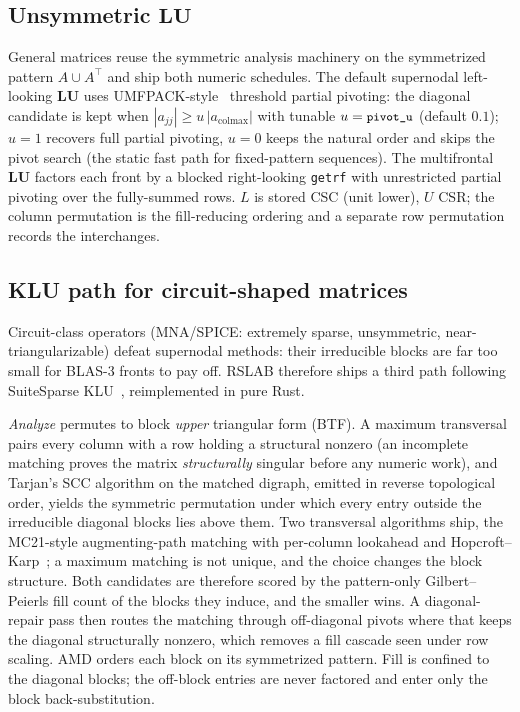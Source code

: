 \documentclass[11pt,a4paper]{article}
\newcommand{\rT}{\textsf{RSLAB}}
\newcommand{\code}[1]{\texttt{\small #1}}
\newcommand{\LU}{\mathbf{L}\mathbf{U}}
\begin{document}
\subsection{Unsymmetric \texorpdfstring{$\LU$}{LU}}
General matrices reuse the symmetric analysis machinery on the symmetrized pattern
$A\cup A^{\!\top}$ and ship both numeric schedules. The default supernodal left-looking
$\LU$ uses UMFPACK-style~\cite{umfpack} threshold partial pivoting: the diagonal
candidate is kept when $|a_{jj}|\ge u\,|a_{\mathrm{colmax}}|$ with tunable
$u=\code{pivot\_u}$ (default $0.1$); $u=1$ recovers full partial pivoting, $u=0$ keeps
the natural order and skips the pivot search (the static fast path for fixed-pattern
sequences). The multifrontal $\LU$ factors each front by a blocked right-looking
\code{getrf} with unrestricted partial pivoting over the fully-summed rows. $L$ is stored
CSC (unit lower), $U$ CSR; the column permutation is the fill-reducing ordering and a
separate row permutation records the interchanges.

\subsection{KLU path for circuit-shaped matrices}
\label{sec:klu}
Circuit-class operators (MNA/SPICE: extremely sparse, unsymmetric,
near-triangularizable) defeat supernodal methods: their irreducible blocks are far too
small for BLAS-3 fronts to pay off. \rT{} therefore ships a third path following
SuiteSparse KLU~\cite{klu}, reimplemented in pure Rust.

\emph{Analyze} permutes to block \emph{upper} triangular form (BTF). A maximum
transversal pairs every column with a row holding a structural nonzero (an incomplete
matching proves the matrix \emph{structurally} singular before any numeric work), and
Tarjan's SCC algorithm on the matched digraph, emitted in reverse topological order,
yields the symmetric permutation under which every entry outside the irreducible diagonal
blocks lies above them. Two transversal algorithms ship, the MC21-style augmenting-path matching with
per-column lookahead and Hopcroft--Karp~\cite{hopcroftkarp}; a maximum matching is not
unique, and the choice changes the block structure. Both candidates are therefore scored
by the pattern-only Gilbert--Peierls fill count of the blocks they induce, and the
smaller wins. A diagonal-repair pass then routes the matching through off-diagonal pivots
where that keeps the diagonal structurally nonzero, which removes a fill cascade seen
under row scaling. AMD orders each block on its symmetrized pattern. Fill is confined to
the diagonal blocks; the off-block entries are never factored and enter only the block
back-substitution.
\end{document}
